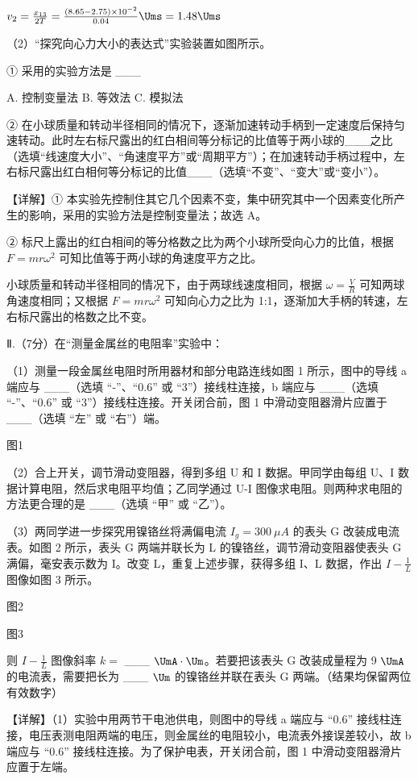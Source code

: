 \documentclass[\gkver]{gaokaozhenti}
\begin{document}
\begin{enumerate}
{ $v_{2}=\frac{x_{13}}{2T}=\frac{(8.65-2.75)\times10^{-2}}{0.04}\Ums=1.48\Ums$

（2）“探究向心力大小的表达式”实验装置如图所示。

① 采用的实验方法是 \_\_\_

A. 控制变量法 B. 等效法 C. 模拟法

② 在小球质量和转动半径相同的情况下，逐渐加速转动手柄到一定速度后保持匀速转动。此时左右标尺露出的红白相间等分标记的比值等于两小球的\_\_\_之比（选填“线速度大小”、“角速度平方”或“周期平方”）；在加速转动手柄过程中，左右标尺露出红白相何等分标记的比值\_\_\_（选填“不变”、“变大”或“变小”）。

【详解】① 本实验先控制住其它几个因素不变，集中研究其中一个因素变化所产生的影响，采用的实验方法是控制变量法；故选 A。

② 标尺上露出的红白相间的等分格数之比为两个小球所受向心力的比值，根据  $F = m r \omega^{2}$ 可知比值等于两小球的角速度平方之比。

小球质量和转动半径相同的情况下，由于两球线速度相同，根据  $\omega = \frac{V}{R}$ 可知两球角速度相同；又根据  $F = m r \omega^{2}$ 可知向心力之比为 1:1，逐渐加大手柄的转速，左右标尺露出的格数之比不变。

Ⅱ.（7分）在“测量金属丝的电阻率”实验中：

（1）测量一段金属丝电阻时所用器材和部分电路连线如图 1 所示，图中的导线 a 端应与 \_\_\_（选填 “-”、“0.6” 或 “3”）接线柱连接，b 端应与 \_\_\_（选填 “-”、“0.6” 或 “3”）接线柱连接。开关闭合前，图 1 中滑动变阻器滑片应置于 \_\_\_（选填 “左” 或 “右”）端。

图1

（2）合上开关，调节滑动变阻器，得到多组 U 和 I 数据。甲同学由每组 U、I 数据计算电阻，然后求电阻平均值；乙同学通过 U-I 图像求电阻。则两种求电阻的方法更合理的是 \_\_\_（选填 “甲” 或 “乙”）。

（3）两同学进一步探究用镍铬丝将满偏电流  $I_{g}=300\ \mu A$ 的表头 G 改装成电流表。如图 2 所示，表头 G 两端并联长为 L 的镍铬丝，调节滑动变阻器使表头 G 满偏，毫安表示数为
I。改变 L，重复上述步骤，获得多组 I、L 数据，作出  $I - \frac{1}{L}$ 图像如图 3 所示。

图2

图3

则  $I - \frac{1}{L}$ 图像斜率  $k =$ \_\_\_ $\UmA\cdot\Um$。若要把该表头 G 改装成量程为 9 $\UmA$ 的电流表，需要把长为 \_\_\_ $\Um$ 的镍铬丝并联在表头 G 两端。（结果均保留两位有效数字）

【详解】（1）实验中用两节干电池供电，则图中的导线 a 端应与 “0.6” 接线柱连接，电压表测电阻两端的电压，则金属丝的电阻较小，电流表外接误差较小，故 b 端应与 “0.6” 接线柱连接。为了保护电表，开关闭合前，图 1 中滑动变阻器滑片应置于左端。

}
\end{enumerate}
\end{document}
